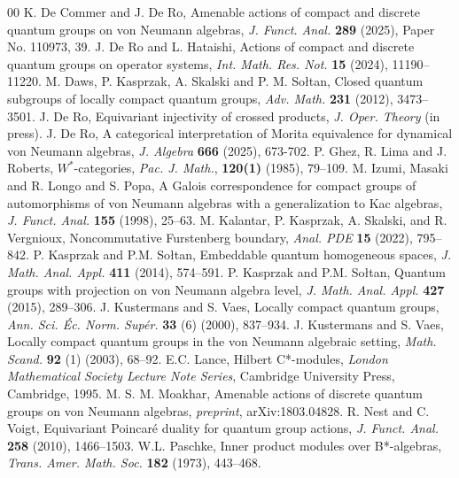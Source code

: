 \documentclass[reqno]{amsart}
\numberwithin{equation}{section}
\begin{document}
\begin{thebibliography}{00}
 K. De Commer and J. De Ro, Amenable actions of compact and discrete quantum groups on von Neumann algebras, \emph{J. Funct. Anal.} \textbf{289} (2025), Paper No. 110973, 39.
 J. De Ro and L. Hataishi, Actions of compact and discrete quantum groups on operator systems, \emph{Int. Math. Res. Not.} \textbf{15} (2024), 11190–11220.
 M. Daws, P. Kasprzak, A. Skalski and P. M. Sołtan, Closed quantum subgroups of locally compact quantum groups, \emph{Adv. Math.} \textbf{231} (2012), 3473--3501.
 J. De Ro, Equivariant injectivity of crossed products, \emph{J. Oper. Theory} (in press).
 J. De Ro, A categorical interpretation of Morita equivalence for dynamical von Neumann algebras, \emph{J. Algebra} \textbf{666} (2025), 673-702.
 P. Ghez, R. Lima and J. Roberts, $W^*$-categories, \emph{Pac. J. Math.}, \textbf{120(1)} (1985), 79--109.
 M. Izumi, Masaki and R. Longo and S. Popa, A {G}alois correspondence for compact groups of automorphisms of von {N}eumann algebras with a generalization to {K}ac algebras, \emph{J. Funct. Anal.} \textbf{155} (1998), 25--63.
  M. Kalantar, P. Kasprzak, A. Skalski, and R. Vergnioux, Noncommutative {F}urstenberg boundary, \emph{Anal. PDE} \textbf{15} (2022), 795--842. 
  P. Kasprzak and P.M. Sołtan, Embeddable quantum homogeneous spaces, \emph{J. Math. Anal. Appl.} \textbf{411} (2014), 574--591.
 P. Kasprzak and P.M. Sołtan, Quantum groups with projection on von Neumann algebra level, \emph{J. Math. Anal. Appl.} \textbf{427} (2015), 289--306.
 J. Kustermans and S. Vaes, Locally compact quantum groups, \emph{Ann. Sci. \'{E}c. Norm. Sup\'{e}r.} \textbf{33} (6) (2000), 837--934.
 J. Kustermans and S. Vaes, Locally compact quantum groups in the von Neumann algebraic setting, \emph{Math. Scand.} \textbf{92} (1) (2003), 68--92.
 E.C. Lance, Hilbert C*-modules, \emph{London Mathematical Society Lecture Note Series}, Cambridge University Press, Cambridge, 1995.
 M. S. M. Moakhar, Amenable actions of discrete quantum groups on von Neumann algebras, \emph{preprint}, arXiv:1803.04828.
 R. Nest and C. Voigt, Equivariant {P}oincar\'e{} duality for quantum group actions, \emph{J. Funct. Anal.} \textbf{258} (2010), 1466--1503.
 W.L. Paschke, Inner product modules over B*-algebras, \emph{Trans. Amer. Math. Soc.} \textbf{182} (1973), 443--468.

\end{thebibliography}
\end{document}
